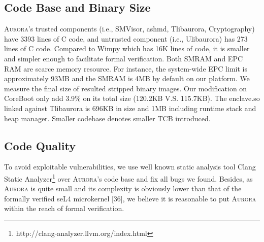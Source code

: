 \subsection{Code Base and Binary Size}\label{codebase}
\textsc{Aurora}'s trusted components (i.e., SMVisor, ashmd, Tlibaurora, Cryptography) have 3393 lines of C code, and untrusted component (i.e., Ulibaurora) has 273 lines of C code. Compared to Wimpy \cite{zhou_dancing_2014} which has 16K lines of code, it is smaller and simpler enough to facilitate formal verification.
Both SMRAM and EPC RAM are scarce memory resource. For instance, the system-wide EPC limit is approximately 93MB and the SMRAM is 4MB by default on our platform. We measure the final size of resulted stripped binary images. Our modification on CoreBoot only add 3.9\% on its total size (120.2KB V.S. 115.7KB). The enclave.so  linked against Tlibaurora is 696KB in size and 1MB including runtime stack and heap manager. Smaller codebase denotes smaller TCB introduced. %

\subsection{Code Quality}
To avoid exploitable vulnerabilities, we use well known static analysis tool Clang Static Analyzer\footnote{http://clang-analyzer.llvm.org/index.html} over \textsc{Aurora}'s code base and fix all bugs we found. Besides, as \textsc{Aurora} is quite small and its complexity is obviously lower than that of the formally verified seL4 microkernel [36],  we believe it is reasonable to put \textsc{Aurora} within the reach of formal verification.

%


